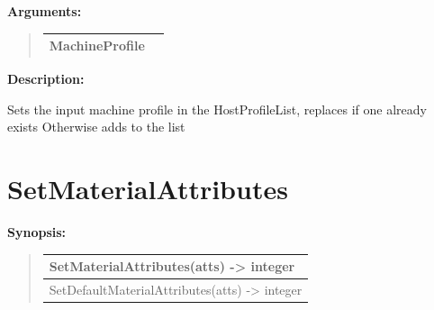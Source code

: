 \documentclass[letterpaper,10pt,english]{sphinxmanual}
\begin{document}
\begin{DUlineblock}{0em}
\item[] 
\item[] \textbf{Arguments:}
\end{DUlineblock}
\begin{quote}

\begin{tabulary}{\linewidth}{|L|L|}
\hline

MachineProfile
 & \\
\hline\end{tabulary}

\end{quote}

\begin{DUlineblock}{0em}
\item[] 
\item[] \textbf{Description:}
\item[] Sets the input machine profile in the HostProfileList, replaces if one already exists
Otherwise adds to the list
\end{DUlineblock}

\begin{DUlineblock}{0em}
\item[] 
\end{DUlineblock}


\section{SetMaterialAttributes}
\label{functions:setmaterialattributes}
\begin{DUlineblock}{0em}
\item[] \textbf{Synopsis:}
\end{DUlineblock}
\begin{quote}

\begin{tabulary}{\linewidth}{|L|}
\hline

SetMaterialAttributes(atts) -\textgreater{} integer
\\
\hline
SetDefaultMaterialAttributes(atts) -\textgreater{} integer
\\
\hline\end{tabulary}

\end{quote}
\end{document}
